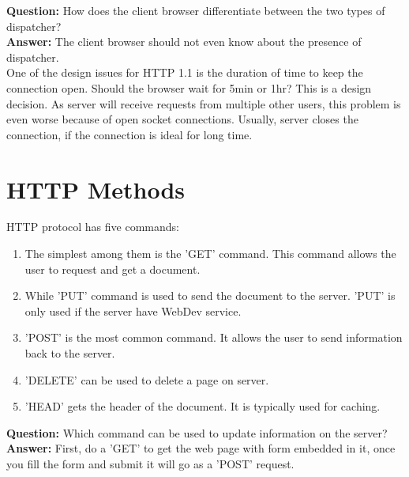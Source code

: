 \documentclass[twoside]{article}
\begin{document}
\textbf{Question:} How does the client browser differentiate between the two types of dispatcher? \\
\textbf{Answer:} The client browser should not even know about the presence of dispatcher. \\
One of the design issues for HTTP 1.1 is the duration of time to keep the connection open. Should the browser wait for 5min or 1hr? This is a design decision. As server will receive requests from multiple other users, this problem is even worse because of open socket connections. Usually, server closes the connection, if the connection is ideal for long time.
\section{HTTP Methods}
HTTP protocol has five commands:
\begin{enumerate}
    \item The simplest among them is the 'GET' command. This command allows the user to request and get a document.
    \item While 'PUT' command is used to send the document to the server. 'PUT' is only used if the server have WebDev service.
    \item 'POST' is the most common command. It allows the user to send information back to the server.
    \item 'DELETE' can be used to delete a page on server.
    \item 'HEAD' gets the header of the document. It is typically used for caching.
\end{enumerate}  

\textbf{Question:} Which command can be used to update information on the server?\\
\textbf{Answer:} First, do a 'GET' to get the web page with form embedded in it, once you fill the form and submit it will go as a  'POST' request. \\
\end{document}
